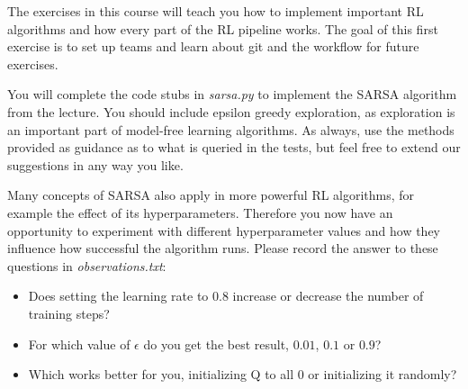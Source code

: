 \documentclass{exam}
\begin{document}
\noindent
The exercises in this course will teach you how to implement important RL algorithms and how every part of the RL pipeline works. The goal of this first exercise is to set up teams and learn about git and the workflow for future exercises.

\begin{questions}
	You will complete the code stubs in \emph{sarsa.py} to implement the SARSA algorithm from the lecture. You should include epsilon greedy exploration, as exploration is an important part of model-free learning algorithms. As always, use the methods provided as guidance as to what is queried in the tests, but feel free to extend our suggestions in any way you like.
	
	Many concepts of SARSA also apply in more powerful RL algorithms, for example the effect of its hyperparameters. Therefore you now have an opportunity to experiment with different hyperparameter values and how they influence how successful the algorithm runs. Please record the answer to these questions in \emph{observations.txt}:
	\begin{itemize}
		\item Does setting the learning rate to $0.8$ increase or decrease the number of training steps?
		\item For which value of $\epsilon$ do you get the best result, $0.01$, $0.1$ or $0.9$?
		\item Which works better for you, initializing Q to all $0$ or initializing it randomly?
	\end{itemize}
\end{questions}
\end{document}
